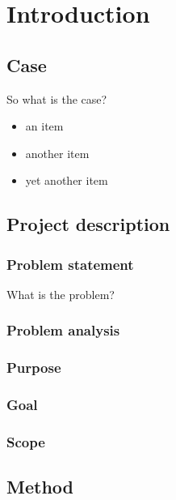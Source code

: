 \chapter{Introduction}
\label{chapter:introduction}

\section{Case}
\label{sec:case}
So what is the case?

\begin{itemize}
	\item an item
	\item another item
	\item yet another item
\end{itemize}

\section{Project description}
\label{sec:project_description}

\subsection{Problem statement}
\label{sec:problem_statement}
What is the problem?

\subsection{Problem analysis}
\label{sec:problem_analysis}

\subsection{Purpose}
\label{sec:purpose}

\subsection{Goal}
\label{sec:goal}

\subsection{Scope}
\label{sec:scope}

\section{Method}
\label{sec:method}